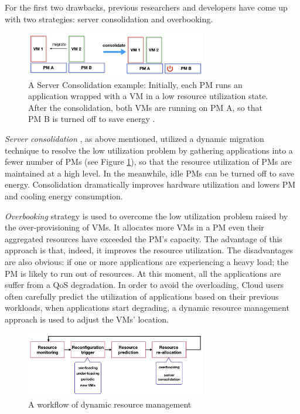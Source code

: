 For the first two drawbacks, previous researchers and developers have come up with two strategies: server consolidation and overbooking.

\begin{figure}
	\centering
	\includegraphics[width=0.7\textwidth]{pics/consolidate.png}
	\caption{A Server Consolidation example: Initially, each PM runs an application wrapped with a VM in a low resource utilization state. After the consolidation, both VMs are running on PM A, so that PM B is turned off to save energy \cite{Barroso:2007jt}.}
	\label{fig:consolidation}
\end{figure} 

\emph{Server consolidation} \cite{Zhang:2010vo}, as above mentioned, utilized a dynamic migration technique to resolve the low utilization problem by gathering applications into a fewer number of PMs (see Figure \ref{fig:consolidation}), so that the resource utilization of PMs are maintained at a high level. In the meanwhile, idle PMs can be turned off to save energy. Consolidation dramatically improves hardware utilization and lowers PM and cooling energy consumption. 

\emph{Overbooking} strategy \cite{Tomas:2013iv} is used to overcome the low utilization problem raised by the over-provisioning of VMs. It allocates more VMs in a PM even their aggregated resources have exceeded the PM's capacity. The advantage of this approach is that, indeed, it improves the resource utilization. The disadvantages are also obvious: if one or more applications are experiencing a heavy load; the PM is likely to run out of resources. At this moment, all the applications are suffer from a QoS degradation. In order to avoid the overloading, Cloud users often carefully predict the utilization of applications based on their previous workloads, when applications start degrading, a dynamic resource management approach is used to adjust the VMs' location.

\begin{figure}
	\centering
	\includegraphics[width=0.7\textwidth]{pics/workflow_management.png}
	\caption{A workflow of dynamic resource management \cite{Mishra:2012kx}}
	\label{fig:workflow}
\end{figure}

